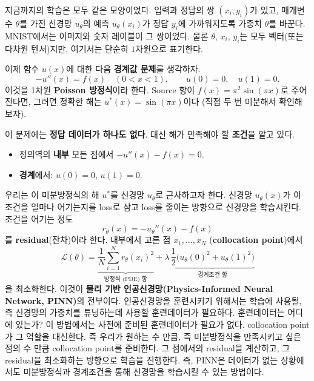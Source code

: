 \documentclass[11pt,a4paper]{article}
\newcommand{\loss}{\mathcal{L}}
\begin{document}
지금까지의 학습은 모두 같은 모양이었다.
입력과 정답의 쌍 $(x_i,y_i)$가 있고, 매개변수 $\theta$를 가진 신경망 $u_{\theta}$의 예측 $u_\theta(x_i)$가 정답 $y_i$에 가까워지도록 가중치 $\theta$를 바꾼다.
MNIST에서는 이미지와 숫자 레이블이 그 쌍이었다. 물론 $\theta$, $x_i$, $y_i$는 모두 벡터(또는 다차원 텐서)지만, 여기서는 단순히 $1$차원으로 표기한다.  

이제 함수 $u(x)$에 대한 다음 \textbf{경계값 문제}를 생각하자.
\begin{equation}\label{eq:poisson}
-u''(x)=f(x)\quad (0<x<1),\qquad u(0)=0,\quad u(1)=0.
\end{equation}
이것을 1차원 \textbf{Poisson 방정식}이라 한다. Source 항이 $f(x)=\pi^2\sin(\pi x)$로 주어진다면, 그러면 정확한 해는 $u^*(x)=\sin(\pi x)$이다
(직접 두 번 미분해서 확인해 보자).

이 문제에는 \textbf{정답 데이터가 하나도 없다}. 대신 해가 만족해야 할 \textbf{조건}을 알고 있다.
\begin{itemize}[leftmargin=1.5em]
\item 정의역의 \textbf{내부} 모든 점에서 $-u''(x)-f(x)=0$.
\item \textbf{경계}에서: $u(0)=0$, $u(1)=0$.
\end{itemize}
우리는 이 미분방정식의 해 $u^*$를 신경망 $u_{\theta}$로 근사하고자 한다. 신경망 $u_\theta(x)$가 이 조건을 얼마나 어기는지를 loss로 삼고 loss를 줄이는 방향으로 신경망을 학습시킨다.
조건을 어기는 정도
\[
r_\theta(x)=-u_\theta''(x)-f(x)
\]
를 \textbf{residual}(잔차)이라 한다. 내부에서 고른 점 $x_1,\dots,x_N$ (\textbf{collocation point})에서
\begin{equation}\label{eq:pinnloss}
\loss(\theta)=\underbrace{\frac1N\sum_{i=1}^N r_\theta(x_i)^2}_{\text{방정식 (PDE) 항}}
+\lambda\,\underbrace{\frac12\Big(u_\theta(0)^2+u_\theta(1)^2\Big)}_{\text{경계조건 항}}
\end{equation}
을 최소화한다. 이것이 \textbf{물리 기반 인공신경망(Physics-Informed Neural Network, PINN)}의 전부이다. 
인공신경망을 훈련시키기 위해서는 학습에 사용될, 즉 신경망의 가중치를 튜닝하는데 사용할 훈련데이터가 필요하다.
훈련데이터는 어디에 있는가? 이 방법에서는 사전에 준비된 훈련데이터가 필요가 없다. collocation point가 그 역할을 대신한다.
즉 우리가 원하는 수 만큼, 즉 미분방정식을 만족시키고 싶은 점의 수 만큼 collocation point를 준비한다. 
그 점에서의 residual을 계산하고, 그 residual을 최소화하는 방향으로 학습을 진행한다. 즉, PINN은 데이터가 없는 상황에서도 미분방정식과 경계조건을 통해 신경망을 학습시킬 수 있는 방법이다. 
\end{document}
